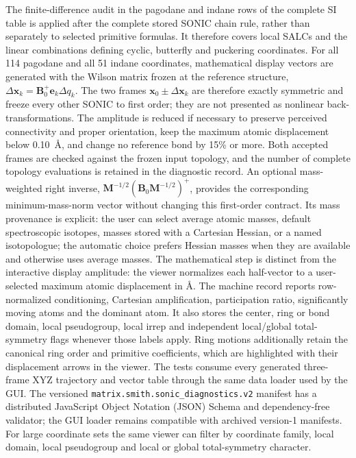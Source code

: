 \documentclass[journal=jctcce,manuscript=article,layout=traditional]{achemso}
\theoremstyle{definition}
\begin{document}
The finite-difference audit in the pagodane and indane rows of the complete SI
table is applied after
the complete stored SONIC chain rule, rather than separately to selected
primitive formulas.  It therefore covers local SALCs and the linear
combinations defining cyclic, butterfly and puckering coordinates.  For all 114
pagodane and all 51 indane coordinates, mathematical display vectors are
generated with the Wilson
matrix frozen at the reference structure,
\(\Delta\mathbf{x}_k=\mathbf{B}_0^+\mathbf{e}_k\Delta q_k\).  The two frames
\(\mathbf{x}_0\pm\Delta\mathbf{x}_k\) are therefore exactly symmetric and
freeze every other SONIC to first order; they are not presented as nonlinear
back-transformations.  The amplitude is reduced if necessary to preserve
perceived connectivity and proper orientation, keep the maximum atomic
displacement below 0.10~\AA, and change no reference bond by 15\% or more.
Both accepted frames are checked against the frozen input topology, and the
number of complete topology evaluations is retained in the diagnostic record.
An optional mass-weighted right inverse,
\(\mathbf{M}^{-1/2}(\mathbf{B}_0\mathbf{M}^{-1/2})^+\), provides the
corresponding minimum-mass-norm vector without changing this first-order
contract.  Its mass provenance is explicit: the user can select average atomic
masses, default spectroscopic isotopes, masses stored with a Cartesian Hessian,
or a named isotopologue; the automatic choice prefers Hessian masses when they
are available and otherwise uses average masses.  The mathematical step is
distinct from the interactive display
amplitude: the viewer normalizes each half-vector to a user-selected maximum
atomic displacement in \AA.  The machine record reports row-normalized
conditioning, Cartesian amplification, participation ratio, significantly
moving atoms and the dominant atom.  It also stores the center, ring or bond
domain, local pseudogroup, local irrep and independent local/global
total-symmetry flags whenever those labels apply.  Ring motions additionally
retain the
canonical ring order and primitive coefficients, which are highlighted with
their displacement arrows in the viewer.  The tests consume every generated
three-frame XYZ trajectory and vector table through the same data loader used
by the GUI.  The versioned \texttt{matrix.smith.sonic\_diagnostics.v2}
manifest has a distributed JavaScript Object Notation (JSON) Schema and
dependency-free validator; the GUI
loader remains compatible with archived version-1 manifests.  For large
coordinate sets the same viewer can filter by coordinate family, local domain,
local pseudogroup and local or global total-symmetry character.
\end{document}
